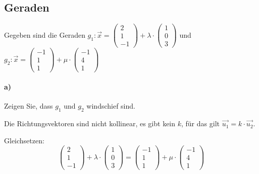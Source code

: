 \documentclass{ajc}
\numberwithin{equation}{subsection}
\begin{document}
	\subsection{Geraden}
	
	Gegeben sind die Geraden $g_1: \vec{x} = \left(\begin{array}{r} 2 \\ 1 \\ -1\end{array}\right) + \lambda \cdot \left(\begin{array}{r} 1 \\ 0 \\ 3\end{array}\right)$ und $g_2: \vec{x} = \left(\begin{array}{r} -1 \\ 1 \\ 1\end{array}\right) + \mu \cdot \left(\begin{array}{r} -1 \\ 4 \\ 1\end{array}\right)$
	
	\paragraph{a)} Zeigen Sie, dass $g_1$ und $g_2$ windschief sind.
	
	Die Richtungsvektoren sind nicht kollinear, es gibt kein $k$, für das gilt $\vec{u_1} =k \cdot \vec{u_2}$.
	
	Gleichsetzen:
	\begin{equation}
		\left(\begin{array}{r} 2 \\ 1 \\ -1\end{array}\right) + \lambda \cdot \left(\begin{array}{r} 1 \\ 0 \\ 3\end{array}\right) = \left(\begin{array}{r} -1 \\ 1 \\ 1\end{array}\right) + \mu \cdot \left(\begin{array}{r} -1 \\ 4 \\ 1\end{array}\right)
	\end{equation}
	
\end{document}
